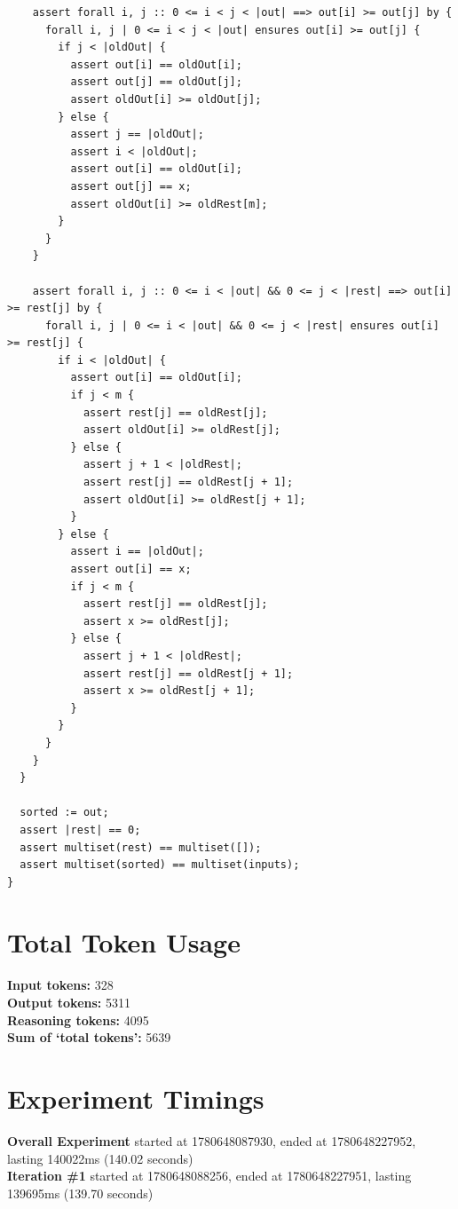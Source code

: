 \documentclass{article}
\begin{document}
\begin{lstlisting}
    assert forall i, j :: 0 <= i < j < |out| ==> out[i] >= out[j] by {
      forall i, j | 0 <= i < j < |out| ensures out[i] >= out[j] {
        if j < |oldOut| {
          assert out[i] == oldOut[i];
          assert out[j] == oldOut[j];
          assert oldOut[i] >= oldOut[j];
        } else {
          assert j == |oldOut|;
          assert i < |oldOut|;
          assert out[i] == oldOut[i];
          assert out[j] == x;
          assert oldOut[i] >= oldRest[m];
        }
      }
    }

    assert forall i, j :: 0 <= i < |out| && 0 <= j < |rest| ==> out[i] >= rest[j] by {
      forall i, j | 0 <= i < |out| && 0 <= j < |rest| ensures out[i] >= rest[j] {
        if i < |oldOut| {
          assert out[i] == oldOut[i];
          if j < m {
            assert rest[j] == oldRest[j];
            assert oldOut[i] >= oldRest[j];
          } else {
            assert j + 1 < |oldRest|;
            assert rest[j] == oldRest[j + 1];
            assert oldOut[i] >= oldRest[j + 1];
          }
        } else {
          assert i == |oldOut|;
          assert out[i] == x;
          if j < m {
            assert rest[j] == oldRest[j];
            assert x >= oldRest[j];
          } else {
            assert j + 1 < |oldRest|;
            assert rest[j] == oldRest[j + 1];
            assert x >= oldRest[j + 1];
          }
        }
      }
    }
  }

  sorted := out;
  assert |rest| == 0;
  assert multiset(rest) == multiset([]);
  assert multiset(sorted) == multiset(inputs);
}
\end{lstlisting}
\section*{Total Token Usage}
\textbf{Input tokens: }328
\\\textbf{Output tokens: }5311
\\\textbf{Reasoning tokens: }4095
\\\textbf{Sum of `total tokens': }5639
\section*{Experiment Timings}
\textbf{Overall Experiment} started at 1780648087930, ended at 1780648227952, lasting 140022ms (140.02 seconds)
\\\textbf{Iteration \#1} started at 1780648088256, ended at 1780648227951, lasting 139695ms (139.70 seconds)
\end{document}
